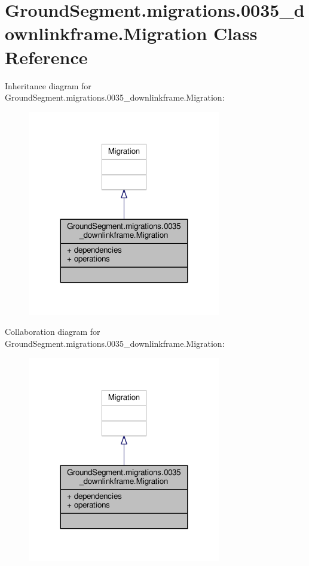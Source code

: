 \hypertarget{class_ground_segment_1_1migrations_1_10035__downlinkframe_1_1_migration}{}\section{Ground\+Segment.\+migrations.0035\+\_\+downlinkframe.Migration Class Reference}
\label{class_ground_segment_1_1migrations_1_10035__downlinkframe_1_1_migration}


Inheritance diagram for Ground\+Segment.\+migrations.0035\+\_\+downlinkframe.Migration\+:\nopagebreak
\begin{figure}[H]
\begin{center}
\leavevmode
\includegraphics[width=239pt]{class_ground_segment_1_1migrations_1_10035__downlinkframe_1_1_migration__inherit__graph}
\end{center}
\end{figure}


Collaboration diagram for Ground\+Segment.\+migrations.0035\+\_\+downlinkframe.Migration\+:\nopagebreak
\begin{figure}[H]
\begin{center}
\leavevmode
\includegraphics[width=239pt]{class_ground_segment_1_1migrations_1_10035__downlinkframe_1_1_migration__coll__graph}
\end{center}
\end{figure}
